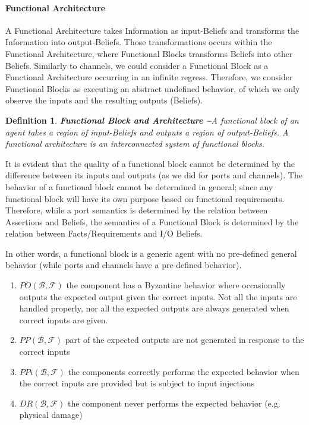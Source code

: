 \documentclass[conference]{IEEEtran}
\newcommand{\beliefRegion}{\mathcal{B}}
\newcommand{\factRegion}{\mathcal{F}}
\newcommand{\pp}[2]{PP(#1,#2)}
\newcommand{\po}[2]{PO(#1,#2)}
\newcommand{\ppi}[2]{PPi(#1,#2)}
\newcommand{\dr}[2]{DR(#1,#2)}
\newtheorem{definition}{Definition}%
\begin{document}
\paragraph{Functional Architecture}
A Functional Architecture takes Information as input-Beliefs and transforms the
Information into output-Beliefs. Those transformations occurs within the
Functional Architecture, where Functional Blocks transforms Beliefs into other
Beliefs. Similarly to channels, we could consider a Functional Block as a
Functional Architecture occurring in an infinite regress. Therefore, we
consider Functional Blocks as executing an abstract undefined behavior, of
which we only observe the inputs and the resulting outputs (Beliefs).

\begin{definition}{\bf Functional Block and Architecture --}\label{def:funblock}
	A functional block of an agent 
	takes a region of input-Beliefs and outputs a region of output-Beliefs. 
	A functional architecture is an interconnected system of functional blocks.
\end{definition}
It is evident that the quality of a functional block cannot be determined
by the difference between its inputs and outputs (as we did for
ports and channels). The behavior of a functional block
cannot be determined in general; since any functional block will have 
its own purpose based on functional requirements. 
Therefore, while a port semantics is determined by the relation 
between Assertions and Beliefs, the semantics of a Functional Block 
is determined by the relation between Facts/Requirements and I/O Beliefs.

In other words, a functional block is a generic agent with no pre-defined general
behavior (while ports and channels have a pre-defined behavior).

\begin{enumerate}[start=50, label={W\arabic*)}]
	\item $\po{\beliefRegion}{\factRegion}$ the component has a Byzantine behavior where occasionally outputs the expected
	        output given the correct inputs. Not all the inputs are handled
	        properly, nor all the expected outputs are always generated
	        when correct inputs are given.
	\item $\pp{\beliefRegion}{\factRegion}$ part of the expected outputs are not
	        generated in response to the correct
	        inputs
	\item $\ppi{\beliefRegion}{\factRegion}$ the components
	        correctly performs the expected behavior when the correct
	        inputs are provided but is subject to input
	        injections
	\item $\dr{\beliefRegion}{\factRegion}$ the component
		never performs the expected behavior (e.g. physical
		damage)
\end{enumerate}
\end{document}
